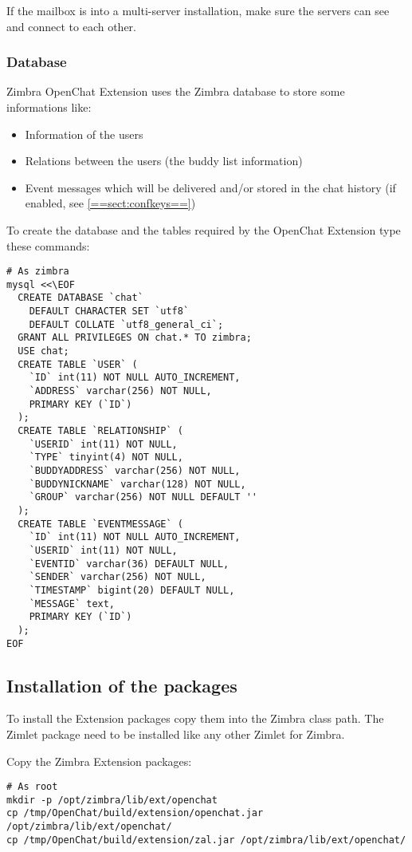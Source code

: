     If the mailbox is into a multi-server installation, make sure the servers can see and connect to each other.

\subsubsection{Database}

    Zimbra OpenChat Extension uses the Zimbra database to store some informations like:
    \begin{itemize}
        \item Information of the users
        \item Relations between the users (the buddy list information)
        \item Event messages which will be delivered and/or stored in the chat history (if enabled, see \ref{==sect:confkeys==})
    \end{itemize}

    To create the database and the tables required by the OpenChat Extension type these commands:
    \begin{verbatim}
# As zimbra
mysql <<\EOF
  CREATE DATABASE `chat`
    DEFAULT CHARACTER SET `utf8`
    DEFAULT COLLATE `utf8_general_ci`;
  GRANT ALL PRIVILEGES ON chat.* TO zimbra;
  USE chat;
  CREATE TABLE `USER` (
    `ID` int(11) NOT NULL AUTO_INCREMENT,
    `ADDRESS` varchar(256) NOT NULL,
    PRIMARY KEY (`ID`)
  );
  CREATE TABLE `RELATIONSHIP` (
    `USERID` int(11) NOT NULL,
    `TYPE` tinyint(4) NOT NULL,
    `BUDDYADDRESS` varchar(256) NOT NULL,
    `BUDDYNICKNAME` varchar(128) NOT NULL,
    `GROUP` varchar(256) NOT NULL DEFAULT ''
  );
  CREATE TABLE `EVENTMESSAGE` (
    `ID` int(11) NOT NULL AUTO_INCREMENT,
    `USERID` int(11) NOT NULL,
    `EVENTID` varchar(36) DEFAULT NULL,
    `SENDER` varchar(256) NOT NULL,
    `TIMESTAMP` bigint(20) DEFAULT NULL,
    `MESSAGE` text,
    PRIMARY KEY (`ID`)
  );
EOF
    \end{verbatim}

\subsection{Installation of the packages}
\label{==sect:installpkgs==}

    To install the Extension packages copy them into the Zimbra class path. The Zimlet package need to be installed like
    any other Zimlet for Zimbra.

    Copy the Zimbra Extension packages:
    \begin{verbatim}
# As root
mkdir -p /opt/zimbra/lib/ext/openchat
cp /tmp/OpenChat/build/extension/openchat.jar /opt/zimbra/lib/ext/openchat/
cp /tmp/OpenChat/build/extension/zal.jar /opt/zimbra/lib/ext/openchat/
    \end{verbatim}

